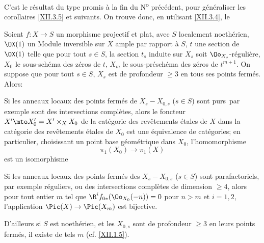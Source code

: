 C'est le r\'esultat du type promis \`a la fin du N\textsuperscript{o} pr\'ec\'edent, pour g\'en\'eraliser les corollaires \ref{XII.3.5} et suivants. On trouve donc, en utilisant \ref{XII.3.4}, le

\begin{corollaire} \label{XII.4.9}
Soient $f:X\to S$ un morphisme projectif et plat, avec $S$ localement noeth\'erien, $\OX(1)$ un Module inversible sur $X$ ample par rapport \`a $S$, $t$ une section de $\OX(1)$ telle que pour tout $s\in S$, la section $t_s$ induite sur $X_s$ soit $\Oo_{X_s}$-r\'eguli\`ere, $X_0$ le sous-sch\'ema des z\'eros de $t$, $X_m$ le sous-pr\'esch\'ema des z\'eros de $t^{m+1}$. On suppose que pour tout $s\in S$, $X_s$ est de profondeur $\geq 3$ en tous ses points ferm\'es. Alors:
\begin{enumeratea}
\item
Si les anneaux locaux des points ferm\'es de $X_s- X_{0, s}$ ($s\in S$) sont \og purs\fg\, par exemple sont des intersections compl\`etes, alors le foncteur $X'\mto X_0'=X'\times_X X_0$ de la cat\'egorie des rev\^etements \'etales de $X$ dans la cat\'egorie des rev\^etements \'etales de $X_0$ est une \'equivalence de cat\'egories; en particulier, choisissant un point base g\'eom\'etrique dans $X_0$, l'homomorphisme
\[
\pi_1(X_0)\to \pi_1(X)
\]
est un isomorphisme

\item
Si les anneaux locaux des points ferm\'es des $X_s- X_{0, s}$ ($s\in S$) sont \og parafactoriels\fg, par exemple r\'eguliers, ou des intersections compl\`etes de dimension $\geq 4$, alors pour tout entier $m$ tel que $\R^if_{0\ast}(\Oo_{X_0}(-n))=0$ pour $n>m$ et $i=1, 2$, l'application $\Pic(X)\to \Pic(X_m)$ est bijective.

D'ailleurs si $S$ est noeth\'erien, et les $ X_{0, s}$ sont de profondeur $\geq 3$ en leurs points ferm\'es, il existe de tels $m$ (cf. \ref{XII.1.5}).
\end{enumeratea}
\end{corollaire}

